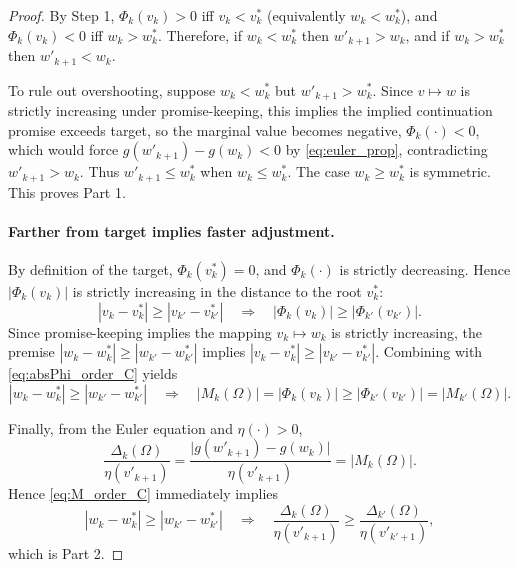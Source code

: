 \begin{proof}
By Step 1, $\Phi_k(v_k)>0$ iff $v_k<v_k^*$ (equivalently $w_k<w_k^*$), and $\Phi_k(v_k)<0$ iff $w_k>w_k^*$.
Therefore, if $w_k<w_k^*$ then $w'_{k+1}>w_k$, and if $w_k>w_k^*$ then $w'_{k+1}<w_k$.

To rule out overshooting, suppose $w_k<w_k^*$ but $w'_{k+1}>w_k^*$.
Since $v\mapsto w$ is strictly increasing under promise-keeping, this implies the implied continuation promise exceeds target,
so the marginal value becomes negative, $\Phi_k(\cdot)<0$, which would force
$g(w'_{k+1})-g(w_k)<0$ by \eqref{eq:euler_prop}, contradicting $w'_{k+1}>w_k$.
Thus $w'_{k+1}\le w_k^*$ when $w_k\le w_k^*$.
The case $w_k\ge w_k^*$ is symmetric. This proves Part 1.

\medskip\noindent
\paragraph{Farther from target implies faster adjustment.}
By definition of the target, $\Phi_k(v_k^*)=0$, and $\Phi_k(\cdot)$ is strictly decreasing.
Hence $|\Phi_k(v_k)|$ is strictly increasing in the distance to the root $v_k^*$:
\begin{equation}\label{eq:absPhi_order_C}
|v_k-v_k^*|\ge |v_{k'}-v_{k'}^*|
\quad\Rightarrow\quad
|\Phi_k(v_k)|\ge |\Phi_{k'}(v_{k'})|.
\end{equation}
Since promise-keeping implies the mapping $v_k\mapsto w_k$ is strictly increasing, the premise
$|w_k-w_k^*|\ge |w_{k'}-w_{k'}^*|$ implies $|v_k-v_k^*|\ge |v_{k'}-v_{k'}^*|$.
Combining with \eqref{eq:absPhi_order_C} yields
\begin{equation}\label{eq:M_order_C}
|w_k-w_k^*|\ge |w_{k'}-w_{k'}^*|
\quad\Rightarrow\quad
|M_k(\Omega)|=|\Phi_k(v_k)|\ge |\Phi_{k'}(v_{k'})|=|M_{k'}(\Omega)|.
\end{equation}

Finally, from the Euler equation  and $\eta(\cdot)>0$,
\[
\frac{\Delta_k(\Omega)}{\eta(v'_{k+1})}
=
\frac{\big|g(w'_{k+1})-g(w_k)\big|}{\eta(v'_{k+1})}
=
|M_k(\Omega)|.
\]
Hence \eqref{eq:M_order_C} immediately implies
\[
|w_k-w_k^*|\ge |w_{k'}-w_{k'}^*|
\quad\Rightarrow\quad
\frac{\Delta_k(\Omega)}{\eta(v'_{k+1})}\ge \frac{\Delta_{k'}(\Omega)}{\eta(v'_{k'+1})},
\]
which is Part 2.
\end{proof}




